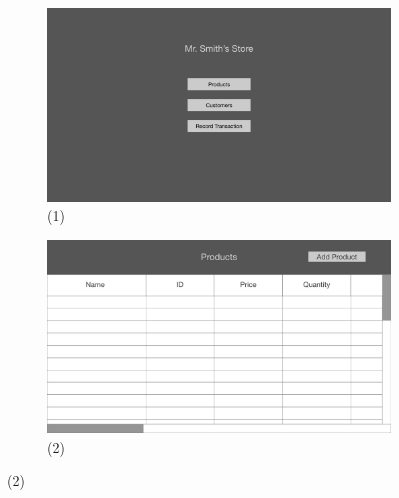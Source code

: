 \documentclass[notitlepage,11pt]{article}
\begin{document}
\begin{figure}[h]
	\begin{subfigure}{.5\textwidth}
	\centering
	\includegraphics[scale=0.12]{MainMenu}
	\caption{(1)}
	\end{subfigure}%
	\begin{subfigure}{.5\textwidth}
	\centering
	\includegraphics[scale=0.12]{AddProduct}
	\caption{(2)}
	\end{subfigure}
\end{figure}
\end{document}
